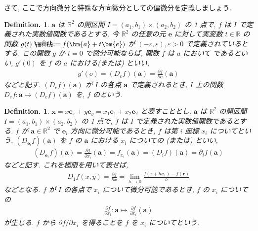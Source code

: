 \documentclass[openany, a4paper, oneside]{book}
\makeatletter
\newcommand*{\defeq}{\mathrel{\rlap{%
\raisebox{0.3ex}{$\m@th\cdot$}}%
\raisebox{-0.3ex}{$\m@th\cdot$}}%
=}
\theoremstyle{break}
\theoremstyle{breakdefn}
\newtheorem{defn}[thm]{Definition.}
\newcommand{\bbR}{\mathbb{R}}
\newcommand{\vep}{\varepsilon}
\makeatother
\begin{document}
さて, ここで方向微分と特殊な方向微分としての偏微分を定義しましょう.
\begin{defn}
 $\bm{a}$ は $\bbR^2$ の開区間 $I=(a_1,b_1)\times (a_2,b_2)$ の 1 点で,
 $f$ は $I$ で定義された実数値関数であるとする.
今 $\bbR^2$ の任意の元 $\bm{e}$ に対して実変数 $t\in\bbR$ の関数
 $g (t)\defeq f (\bm{a}+t\bm{e})$ が $(-\vep,\vep),\vep>0$ で定義されているとする.
この関数 $g$ が $t=0$ で微分可能ならば, 関数 $f$ は $a$ において
であるといい,  $g'(0)$ を $f$ の
 $a$ における(または) といい,
    \begin{align}
        g'(o)
        =
        (D_ef) (\bm{a})
        =
        \frac{\partial f} {\partial \bm{e}}(\bm{a})
    \end{align}
などと記す.  $(D_ef) (\bm{a})$ が $I$ の各点 $\bm{a}$ で定義されるとき,  $I$ 上の関数
 $D_ef:\bm{a}\mapsto (D_ef) (\bm{a})$ を,  $f$ のという.
\end{defn}
\begin{defn}
 $\bm{x}=x\bm{e}_x+y\bm{e}_y=x_1\bm{e}_1+x_2\bm{e}_2$ と表すこととし,
 $\bm{a}$ は $\bbR^2$ の開区間 $I=(a_1,b_1)\times (a_2,b_2)$ の 1 点で,
 $f$ は $I$ で定義された実数値関数であるとする.
 $f$ が $\bm{a}\in\bbR^2$ で $\bm{e}_i$ 方向に微分可能であるとき,
 $f$ は第 $i$ 座標 $x_i$ についてという.
 $(D_{\bm{e}_i}f) (\bm{a})$ を $f$ の $\bm{a}$ における $x_i$ についての
(または) といい,
\begin{align}
 (D_{\bm{e}_i}f) (\bm{a})
 =
 \frac{\partial f} {\partial x_i}(\bm{a})
 =
 f_{x_i}(\bm{a})
 =
 (D_if) (\bm{a})
 =
 \partial _i f (\bm{a})
\end{align}
などと記す.
これを極限を用いて表せば,
\begin{align}
 D_1f (x,y)
 =
 \frac{\partial f} {\partial x}
 =
 \lim_{h\to 0}\frac{f ( \bm{r} + h \bm{e}_1 ) - f (\bm{r}) } {h}
\end{align}
などとなる.
$f$ が $I$ の各点で $x_i$ について微分可能であるとき, $f$ の $x_i$ についての
\begin{align}
 \frac{\partial f}{\partial x_i}:\bm{a} \mapsto \frac{\partial f}{\partial x_i}(\bm{a})
\end{align}
が生じる.  $f$ から $\partial f/ \partial x_i$ を得ることを $f$ を $x_i$ についてという.
\end{defn}
\end{document}
